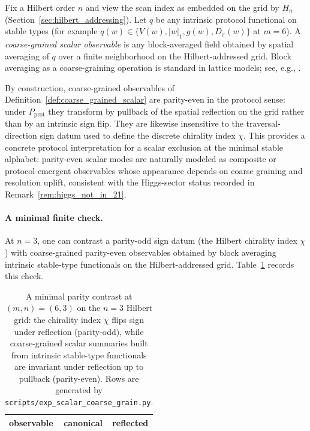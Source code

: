 \begin{definition}\label{def:coarse_grained_scalar}
Fix a Hilbert order $n$ and view the scan index as embedded on the grid by $H_n$ (Section~\ref{sec:hilbert_addressing}).
Let $q$ be any intrinsic protocol functional on stable types (for example $q(w)\in\{V(w),|w|_1,g(w),D_\pi(w)\}$ at $m=6$).
A \emph{coarse-grained scalar observable} is any block-averaged field obtained by spatial averaging of $q$ over a finite neighborhood on the Hilbert-addressed grid.
Block averaging as a coarse-graining operation is standard in lattice models; see, e.g., \cite{Wilson1974,Rothe2012}.
\end{definition}

\begin{remark}\label{rem:scalar_emergent_route}
By construction, coarse-grained observables of Definition~\ref{def:coarse_grained_scalar} are parity-even in the protocol sense: under $P_{\mathrm{prot}}$ they transform by pullback of the spatial reflection on the grid rather than by an intrinsic sign flip.
They are likewise insensitive to the traversal-direction sign datum used to define the discrete chirality index $\chi$.
This provides a concrete protocol interpretation for a scalar exclusion at the minimal stable alphabet: parity-even scalar modes are naturally modeled as composite or protocol-emergent observables whose appearance depends on coarse graining and resolution uplift, consistent with the Higgs-sector status recorded in Remark~\ref{rem:higgs_not_in_21}.
\end{remark}

\paragraph{A minimal finite check.}
At $n=3$, one can contrast a parity-odd sign datum (the Hilbert chirality index $\chi$) with coarse-grained parity-even observables obtained by block averaging intrinsic stable-type functionals on the Hilbert-addressed grid.
Table~\ref{tab:scalar_coarse_grain} records this check.

\begin{table}[t]
\centering
\small
\setlength{\tabcolsep}{8pt}
\renewcommand{\arraystretch}{1.15}
\begin{tabular}{lcc}
\toprule
observable & canonical & reflected \\
\midrule
%
\end{tabular}
\caption{A minimal parity contrast at $(m,n)=(6,3)$ on the $n=3$ Hilbert grid: the chirality index $\chi$ flips sign under reflection (parity-odd), while coarse-grained scalar summaries built from intrinsic stable-type functionals are invariant under reflection up to pullback (parity-even). Rows are generated by \texttt{scripts/exp\_scalar\_coarse\_grain.py}.}
\label{tab:scalar_coarse_grain}
\end{table}


